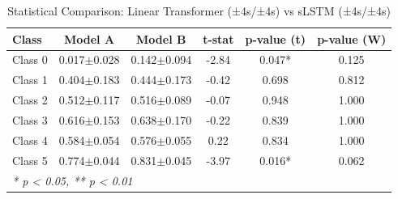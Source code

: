 \begin{table}[htbp]
\centering
\caption{Statistical Comparison: Linear Transformer (±4s/±4s) vs sLSTM (±4s/±4s)}
\label{tab:comparison_class_linear_transformer_±4s_±4s_vs_slstm_±4s_±4s}
\begin{tabular}{lccccc}
\toprule
\textbf{Class} & \textbf{Model A} & \textbf{Model B} & \textbf{t-stat} & \textbf{p-value (t)} & \textbf{p-value (W)} \\
\midrule
Class 0 & 0.017$\pm$0.028 & 0.142$\pm$0.094 & -2.84 & 0.047* & 0.125 \\
Class 1 & 0.404$\pm$0.183 & 0.444$\pm$0.173 & -0.42 & 0.698 & 0.812 \\
Class 2 & 0.512$\pm$0.117 & 0.516$\pm$0.089 & -0.07 & 0.948 & 1.000 \\
Class 3 & 0.616$\pm$0.153 & 0.638$\pm$0.170 & -0.22 & 0.839 & 1.000 \\
Class 4 & 0.584$\pm$0.054 & 0.576$\pm$0.055 & 0.22 & 0.834 & 1.000 \\
Class 5 & 0.774$\pm$0.044 & 0.831$\pm$0.045 & -3.97 & 0.016* & 0.062 \\
\bottomrule
\multicolumn{6}{l}{\textit{* p < 0.05, ** p < 0.01}} \\
\end{tabular}
\end{table}